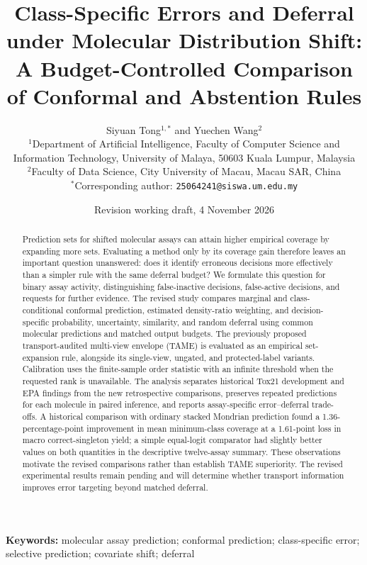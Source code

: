 \documentclass[11pt]{article}
\title{Class-Specific Errors and Deferral under Molecular Distribution Shift: A Budget-Controlled Comparison of Conformal and Abstention Rules}
\author{\begin{minipage}{0.94\textwidth}\centering
Siyuan Tong$^{1,*}$ and Yuechen Wang$^2$\\[0.3em]
\small $^1$Department of Artificial Intelligence, Faculty of Computer Science and Information Technology, University of Malaya, 50603 Kuala Lumpur, Malaysia\\
\small $^2$Faculty of Data Science, City University of Macau, Macau SAR, China\\
\small $^*$Corresponding author: \texttt{25064241@siswa.um.edu.my}
\end{minipage}}
\date{Revision working draft, 4 November 2026}
\begin{document}
\maketitle
\begin{center}
\end{center}

\begin{abstract}
Prediction sets for shifted molecular assays can attain higher empirical coverage by expanding more sets. Evaluating a method only by its coverage gain therefore leaves an important question unanswered: does it identify erroneous decisions more effectively than a simpler rule with the same deferral budget? We formulate this question for binary assay activity, distinguishing false-inactive decisions, false-active decisions, and requests for further evidence. The revised study compares marginal and class-conditional conformal prediction, estimated density-ratio weighting, and decision-specific probability, uncertainty, similarity, and random deferral using common molecular predictions and matched output budgets. The previously proposed transport-audited multi-view envelope (TAME) is evaluated as an empirical set-expansion rule, alongside its single-view, ungated, and protected-label variants. Calibration uses the finite-sample order statistic with an infinite threshold when the requested rank is unavailable. The analysis separates historical Tox21 development and EPA findings from the new retrospective comparisons, preserves repeated predictions for each molecule in paired inference, and reports assay-specific error--deferral trade-offs. A historical comparison with ordinary stacked Mondrian prediction found a 1.36-percentage-point improvement in mean minimum-class coverage at a 1.61-point loss in macro correct-singleton yield; a simple equal-logit comparator had slightly better values on both quantities in the descriptive twelve-assay summary. These observations motivate the revised comparisons rather than establish TAME superiority. The revised experimental results remain pending and will determine whether transport information improves error targeting beyond matched deferral.
\end{abstract}
\noindent\textbf{Keywords:} molecular assay prediction; conformal prediction; class-specific error; selective prediction; covariate shift; deferral
\end{document}
